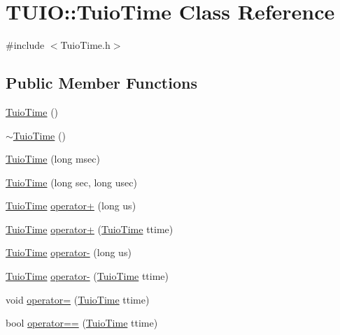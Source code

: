 \hypertarget{class_t_u_i_o_1_1_tuio_time}{}\section{T\+U\+IO\+:\+:Tuio\+Time Class Reference}
\label{class_t_u_i_o_1_1_tuio_time}


{\ttfamily \#include $<$Tuio\+Time.\+h$>$}

\subsection*{Public Member Functions}
\begin{DoxyCompactItemize}
\item 
\hyperlink{class_t_u_i_o_1_1_tuio_time_a924521ecf43b6484fad9550661eedb0a}{Tuio\+Time} ()
\item 
\hyperlink{class_t_u_i_o_1_1_tuio_time_a3128aa283fb3df08ac1f5915f892e101}{$\sim$\+Tuio\+Time} ()
\item 
\hyperlink{class_t_u_i_o_1_1_tuio_time_a5005f23550f8fa8458c388a67b302ab8}{Tuio\+Time} (long msec)
\item 
\hyperlink{class_t_u_i_o_1_1_tuio_time_a4d1a4559c5c389d480ecaa3e5cafbfe9}{Tuio\+Time} (long sec, long usec)
\item 
\hyperlink{class_t_u_i_o_1_1_tuio_time}{Tuio\+Time} \hyperlink{class_t_u_i_o_1_1_tuio_time_a182951527d8e7654a653ac49112a9fb1}{operator+} (long us)
\item 
\hyperlink{class_t_u_i_o_1_1_tuio_time}{Tuio\+Time} \hyperlink{class_t_u_i_o_1_1_tuio_time_a78bbf034a3b03400954e3dd3a6ba0ba4}{operator+} (\hyperlink{class_t_u_i_o_1_1_tuio_time}{Tuio\+Time} ttime)
\item 
\hyperlink{class_t_u_i_o_1_1_tuio_time}{Tuio\+Time} \hyperlink{class_t_u_i_o_1_1_tuio_time_a08d774edb8feaec79f5df44dddaa3a9c}{operator-\/} (long us)
\item 
\hyperlink{class_t_u_i_o_1_1_tuio_time}{Tuio\+Time} \hyperlink{class_t_u_i_o_1_1_tuio_time_af72bee5bd9ce897e017a3106b51b3532}{operator-\/} (\hyperlink{class_t_u_i_o_1_1_tuio_time}{Tuio\+Time} ttime)
\item 
void \hyperlink{class_t_u_i_o_1_1_tuio_time_a34ae143720ec8f24e8381775ffff340e}{operator=} (\hyperlink{class_t_u_i_o_1_1_tuio_time}{Tuio\+Time} ttime)
\item 
bool \hyperlink{class_t_u_i_o_1_1_tuio_time_a15f1b26aa7b3c9a10db9e4a7781a7765}{operator==} (\hyperlink{class_t_u_i_o_1_1_tuio_time}{Tuio\+Time} ttime)
\item 

\end{DoxyCompactItemize}
